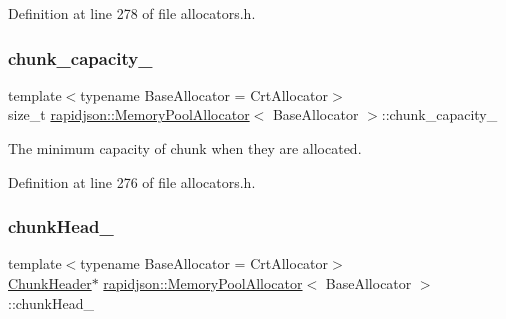 Definition at line 278 of file allocators.\+h.

\mbox{\label{classrapidjson_1_1_memory_pool_allocator_a5de12903a376ea7128e65890a287050c}} 
\subsubsection{\texorpdfstring{chunk\_capacity\_}{chunk\_capacity\_}}
{\footnotesize\ttfamily template$<$typename Base\+Allocator = Crt\+Allocator$>$ \\
size\+\_\+t \mbox{\hyperlink{classrapidjson_1_1_memory_pool_allocator}{rapidjson\+::\+Memory\+Pool\+Allocator}}$<$ Base\+Allocator $>$\+::chunk\+\_\+capacity\+\_\+\hspace{0.3cm}{\ttfamily [private]}}



The minimum capacity of chunk when they are allocated. 



Definition at line 276 of file allocators.\+h.

\mbox{\label{classrapidjson_1_1_memory_pool_allocator_a64acbd6f74dd8757baa2a9f6b5841400}} 
\subsubsection{\texorpdfstring{chunkHead\_}{chunkHead\_}}
{\footnotesize\ttfamily template$<$typename Base\+Allocator = Crt\+Allocator$>$ \\
\mbox{\hyperlink{structrapidjson_1_1_memory_pool_allocator_1_1_chunk_header}{Chunk\+Header}}$\ast$ \mbox{\hyperlink{classrapidjson_1_1_memory_pool_allocator}{rapidjson\+::\+Memory\+Pool\+Allocator}}$<$ Base\+Allocator $>$\+::chunk\+Head\+\_\+\hspace{0.3cm}{\ttfamily [private]}}



